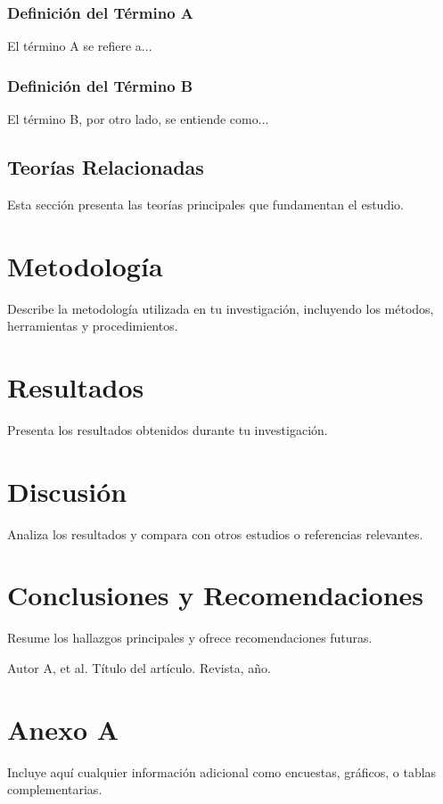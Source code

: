 \documentclass[12pt]{report}
\begin{document}
\subsection{Definición del Término A}
El término A se refiere a...

\subsection{Definición del Término B}
El término B, por otro lado, se entiende como...

\section{Teorías Relacionadas}
Esta sección presenta las teorías principales que fundamentan el estudio.
\chapter{Metodología}
Describe la metodología utilizada en tu investigación, incluyendo los métodos, herramientas y procedimientos.

\chapter{Resultados}
Presenta los resultados obtenidos durante tu investigación.

\chapter{Discusión}
Analiza los resultados y compara con otros estudios o referencias relevantes.

\chapter{Conclusiones y Recomendaciones}
Resume los hallazgos principales y ofrece recomendaciones futuras.


\begin{thebibliography}{9}
	 Autor A, et al. Título del artículo. Revista, año.
\end{thebibliography}


\appendix
\chapter{Anexo A}
Incluye aquí cualquier información adicional como encuestas, gráficos, o tablas complementarias.
\end{document}
